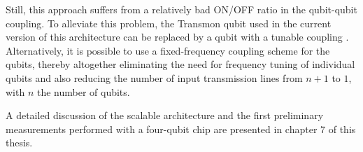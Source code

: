 Still, this approach suffers from a relatively bad ON/OFF ratio in the qubit-qubit coupling. To alleviate this problem, the Transmon qubit used in the current version of this architecture can be replaced by a qubit with a tunable coupling \citep{srinivasan_tunable_2011}. Alternatively, it is possible to use a fixed-frequency coupling scheme for the qubits, thereby altogether eliminating the need for frequency tuning of individual qubits and also reducing the number of input transmission lines from $n+1$ to $1$, with $n$ the number of qubits.

\smallskip

A detailed discussion of the scalable architecture and the first preliminary measurements performed with a four-qubit chip are presented in chapter 7 of this thesis.